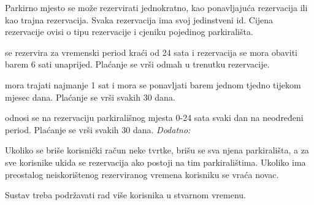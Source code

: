 Parkirno mjesto se može rezervirati jednokratno, kao ponavljajuća rezervacija ili kao trajna rezervacija. Svaka rezervacija ima svoj jedinstveni id. Cijena rezervacije ovisi o tipu rezervacije i cjeniku pojedinog parkirališta.

\textit{} se rezervira za vremenski period kraći od 24 sata i rezervacija se mora obaviti barem 6 sati unaprijed. Plaćanje se vrši odmah u trenutku rezervacije.

\textit{} mora trajati najmanje 1 sat i mora se ponavljati barem jednom tjedno tijekom mjesec dana. Plaćanje se vrši svakih 30 dana.

\textit{} odnosi se na rezervaciju parkirališnog mjesta 0-24 sata svaki dan na neodređeni period. Plaćanje se vrši svakih 30 dana.
\newline
\newline
\textit{Dodatno:}

Ukoliko se briše korisnički račun neke tvrtke, brišu se sva njena parkirališta, a za sve korisnike ukida se rezervacija ako postoji na tim parkiralištima. Ukoliko ima preostalog neiskorištenog rezerviranog vremena korisniku se vraća novac.

Sustav treba podržavati rad više korisnika u stvarnom vremenu.
